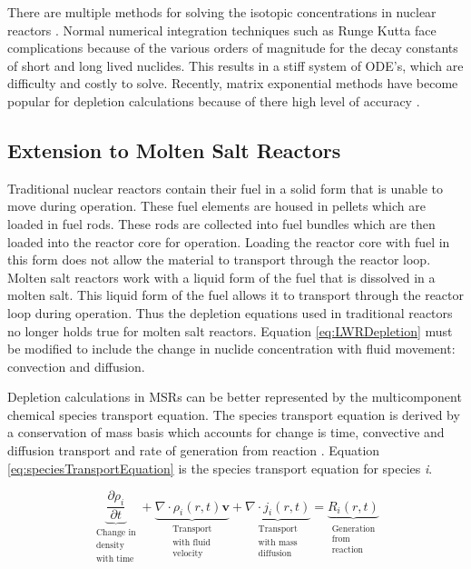 There are multiple methods for solving the isotopic concentrations in nuclear reactors \cite{isotalo2011} \cite{pusa2010} \cite{akio2007}. Normal numerical integration techniques such as Runge Kutta face complications because of the various orders of magnitude for the decay constants of short and long lived nuclides. This results in a stiff system of ODE's, which are difficulty and costly to solve. Recently, matrix exponential methods have become popular for depletion calculations because of there high level of accuracy \cite{pusaThesis} \cite{aarnoThesis}. 

\subsection{Extension to Molten Salt Reactors}
Traditional nuclear reactors contain their fuel in a solid form that is unable to move during operation. These fuel elements are housed in pellets which are loaded in fuel rods. These rods are collected into fuel bundles which are then loaded into the reactor core for operation. Loading the reactor core with fuel in this form does not allow the material to transport through the reactor loop. Molten salt reactors work with a liquid form of the fuel that is dissolved in a molten salt. This liquid form of the fuel allows it to transport through the reactor loop during operation. Thus the depletion equations used in traditional reactors no longer holds true for molten salt reactors. Equation \ref{eq:LWRDepletion} must be modified to include the change in nuclide concentration with fluid movement: convection and diffusion. 

Depletion calculations in MSRs can be better represented by the multicomponent chemical species transport equation. The species transport equation is derived by a conservation of mass basis which accounts for change is time, convective and diffusion transport and rate of generation from reaction \cite{bird2006}. Equation \ref{eq:speciesTransportEquation} is the species transport equation for species \textit{i}. 

\begin{equation}
    \underbrace{\frac{\partial \rho_{i}}{\partial t}}_{\substack{\text{Change in} \\
    \text{density} \\
    \text{with time}}} + 
    \underbrace{\nabla \cdot \rho_{i}(r,t)\boldsymbol{v}}_{\substack{\text{Transport} \\
    \text{with fluid} \\
    \text{velocity}}}
    + \underbrace{\nabla \cdot j_{i}(r,t)}_{\substack{\text{Transport} \\
    \text{with mass} \\
    \text{diffusion}}} = 
    \underbrace{R_{i}(r,t)}_{\substack{\text{Generation} \\
    \text{from} \\
    \text{reaction}}}
    \label{eq:speciesTransportEquation}
\end{equation}

